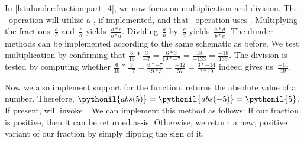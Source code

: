 In \cref{lst:dunder:fraction:part_4}, we now focus on multiplication and division.
The \pythonil{*}~operation will utilize a , if implemented, and that \pythonil{/}~operation uses .
Multiplying the fractions~$\frac{a}{b}$ and~$\frac{c}{d}$ yields~$\frac{a*c}{b*d}$.
Dividing~$\frac{a}{b}$ by~$\frac{c}{d}$ yields~$\frac{a*d}{b*c}$.
The dunder methods can be implemented according to the same schematic as before.
We test multiplication by confirming that $\frac{6}{19}*\frac{3}{-7}=\frac{6 * 3}{19*-7}=\frac{18}{-133}=\frac{-18}{133}$.
The division is tested by computing whether $\frac{6}{19}*\frac{3}{-7}=\frac{6 * -7}{19*3}=\frac{-42}{57}=\frac{3*-14}{3*19}$ indeed gives us~$\frac{-14}{19}$.

Now we also implement support for the  function.
 returns the absolute value of a number.
Therefore, $\pythonil{abs(5)}=\pythonil{abs(-5)}=\pythonil{5}$.
If present,  will invoke~.
We can implement this method as follows:
If our fraction is positive, then it can be returned as-is.
Otherwise, we return a new, positive variant of our fraction by simply flipping the sign of it.

